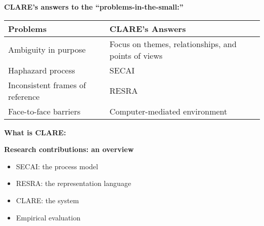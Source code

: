 \begin{slide} \Huge
  {\bf CLARE's answers to the ``problems-in-the-small:''}
  \horizontalline
    
  \begin{center}
    \begin{tabular} {||p{3.3in}|p{5.2in}||} \hline   
    {\bf Problems} &   {\bf CLARE's Answers} \\ \hline \hline 
    
    Ambiguity in purpose & Focus on themes, relationships, and points
    of views \\ \hline
     
    Haphazard process & SECAI \\ \hline
     
    Inconsistent frames of reference & RESRA \\
    \hline
    
    Face-to-face barriers & Computer-mediated environment\\
    \hline \hline
   \end{tabular}
  \end{center}
\end{slide} \Huge


\begin{slide} \Huge 
  {\bf What is CLARE:} 
  \horizontalline
  \bigskip

  \centerline{}
\end{slide} \Huge


\begin{slide} \Huge 
  {\bf Research contributions: an overview}
  \horizontalline

  \begin{itemize}
  \item SECAI: the process model
      
 \item RESRA: the representation language
 
  \item CLARE: the system
      
  \item Empirical evaluation
  \end{itemize}
\end{slide} \Huge


